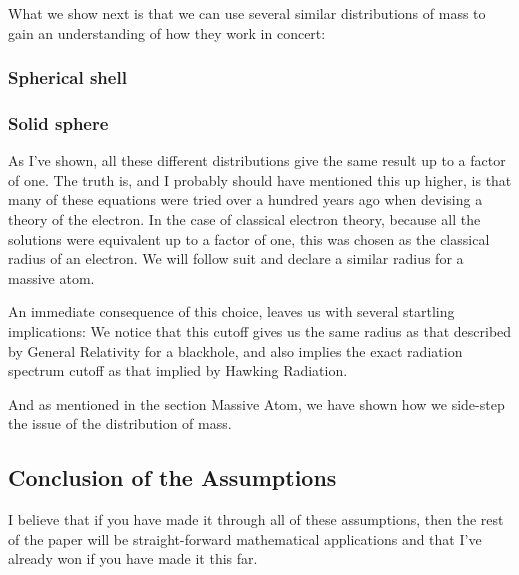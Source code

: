 \documentclass {article}
\begin{document}
What we show next is that we can use several similar distributions of mass to gain an understanding of how they work in concert:

\subsubsection{Spherical shell}

\subsubsection{Solid sphere}

As I’ve shown, all these different distributions give the same result up to a factor of one. The truth is, and I probably should have mentioned this up higher, is that many of these equations were tried over a hundred years ago when devising a theory of the electron. In the case of classical electron theory, because all the solutions were equivalent up to a factor of one, this was chosen as the classical radius of an electron. We will follow suit and declare a similar radius for a massive atom.

An immediate consequence of this choice, leaves us with several startling implications: We notice that this cutoff gives us the same radius as that described by General Relativity for a blackhole, and also implies the exact radiation spectrum cutoff as that implied by Hawking Radiation.

And as mentioned in the section Massive Atom, we have shown how we side-step the issue of the distribution of mass.

\subsection{Conclusion of the Assumptions}

I believe that if you have made it through all of these assumptions, then the rest of the paper will be straight-forward mathematical applications and that I’ve already won if you have made it this far.
\end{document}
